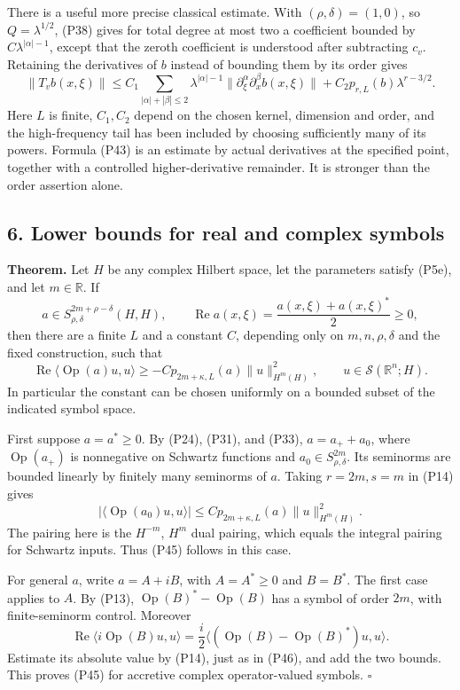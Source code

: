 \documentclass[
  11pt,
]{article}
\begin{document}
There is a useful more precise classical estimate. With
\((\rho,\delta)=(1,0)\), so \(Q=\lambda^{1/2}\), (P38) gives for total
degree at most two a coefficient bounded by \(C\lambda^{|\alpha|-1}\),
except that the zeroth coefficient is understood after subtracting
\(c_v\). Retaining the derivatives of \(b\) instead of bounding them by
its order gives \[
 \|T_vb(x,\xi)\|
 \leq C_1\sum_{|\alpha|+|\beta|\leq2}
 \lambda^{|\alpha|-1}
 \|\partial_\xi^\alpha\partial_x^\beta b(x,\xi)\|
 +C_2p_{r,L}(b)\lambda^{r-3/2}.
\tag{P43}
\] Here \(L\) is finite, \(C_1,C_2\) depend on the chosen kernel,
dimension and order, and the high-frequency tail has been included by
choosing sufficiently many of its powers. Formula (P43) is an estimate
by actual derivatives at the specified point, together with a controlled
higher-derivative remainder. It is stronger than the order assertion
alone.

\subsection{6. Lower bounds for real and complex
symbols}\label{lower-bounds-for-real-and-complex-symbols}

\textbf{Theorem.} Let \(H\) be any complex Hilbert space, let the
parameters satisfy (P5e), and let \(m\in\mathbb R\). If \[
 a\in S^{2m+\rho-\delta}_{\rho,\delta}(H,H),
 \qquad \operatorname{Re}a(x,\xi)=\frac{a(x,\xi)+a(x,\xi)^*}{2}\geq0,
\tag{P44}
\] then there are a finite \(L\) and a constant \(C\), depending only on
\(m,n,\rho,\delta\) and the fixed construction, such that \[
 \operatorname{Re}\langle\operatorname{Op}(a)u,u\rangle
 \geq-Cp_{2m+\kappa,L}(a)\|u\|_{H^m(H)}^2,
 \qquad u\in\mathcal S(\mathbb R^n;H).
\tag{P45}
\] In particular the constant can be chosen uniformly on a bounded
subset of the indicated symbol space.

First suppose \(a=a^*\geq0\). By (P24), (P31), and (P33), \(a=a_++a_0\),
where \(\operatorname{Op}(a_+)\) is nonnegative on Schwartz functions
and \(a_0\in S^{2m}_{\rho,\delta}\). Its seminorms are bounded linearly
by finitely many seminorms of \(a\). Taking \(r=2m,s=m\) in (P14) gives
\[
 |\langle\operatorname{Op}(a_0)u,u\rangle|
 \leq Cp_{2m+\kappa,L}(a)\|u\|_{H^m(H)}^2.
\tag{P46}
\] The pairing here is the \(H^{-m}\), \(H^m\) dual pairing, which
equals the integral pairing for Schwartz inputs. Thus (P45) follows in
this case.

For general \(a\), write \(a=A+iB\), with \(A=A^*\geq0\) and \(B=B^*\).
The first case applies to \(A\). By (P13),
\(\operatorname{Op}(B)^*-\operatorname{Op}(B)\) has a symbol of order
\(2m\), with finite-seminorm control. Moreover \[
 \operatorname{Re}\langle i\operatorname{Op}(B)u,u\rangle
 =\frac{i}{2}\langle
 (\operatorname{Op}(B)-\operatorname{Op}(B)^*)u,u\rangle.
\tag{P47}
\] Estimate its absolute value by (P14), just as in (P46), and add the
two bounds. This proves (P45) for accretive complex operator-valued
symbols. \(\square\)
\end{document}
